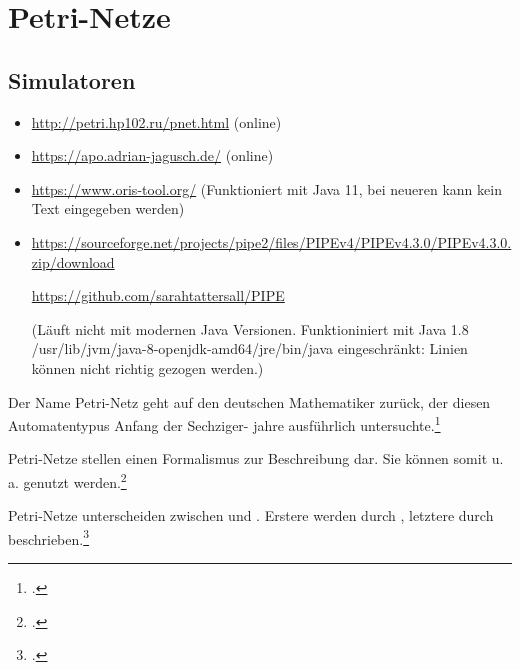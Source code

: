 \documentclass{bschlangaul-theorie}
\begin{document}
\def\TmpBeschriftung#1{%
  {%
    \footnotesize%
    \itshape#1%
  }%
}


\chapter{Petri-Netze}

\begin{bQuellen}
\item \cite[Seite 238-242]{hoffmann}
\end{bQuellen}

\section{Simulatoren}

\begin{itemize}
\item \url{http://petri.hp102.ru/pnet.html} (online)
\item \url{https://apo.adrian-jagusch.de/} (online)
\item \url{https://www.oris-tool.org/} (Funktioniert mit Java 11, bei neueren kann kein Text eingegeben werden)
\item \url{https://sourceforge.net/projects/pipe2/files/PIPEv4/PIPEv4.3.0/PIPEv4.3.0.zip/download}

\url{https://github.com/sarahtattersall/PIPE}

(Läuft nicht mit modernen Java Versionen. Funktioniniert mit Java 1.8
/usr/lib/jvm/java-8-openjdk-amd64/jre/bin/java eingeschränkt: Linien
können nicht richtig gezogen werden.)
\end{itemize}

\noindent
Der Name Petri-Netz geht auf den deutschen Mathematiker  zurück, der diesen Automatentypus Anfang der Sechziger- jahre
ausführlich untersuchte.\footcite[Seite 238]{hoffmann}

Petri-Netze stellen einen Formalismus zur Beschreibung
 dar.
%
Sie können somit u.\,a. 
genutzt werden.\footcite{sosy:fs:3}

Petri-Netze unterscheiden zwischen  und
. Erstere werden durch , letztere
durch  beschrieben.\footcite[Seite 238]{hoffmann}
\end{document}
